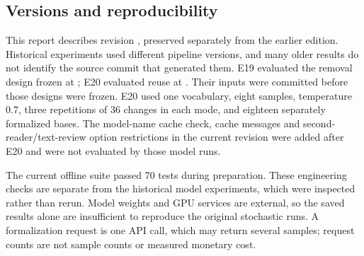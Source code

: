 \subsection{Versions and reproducibility}
This report describes revision , preserved separately from the earlier  edition. Historical experiments used different pipeline versions, and many older results do not identify the source commit that generated them. E19 evaluated the removal design frozen at ; E20 evaluated reuse at . Their inputs were committed before those designs were frozen. E20 used one vocabulary, eight samples, temperature 0.7, three repetitions of 36 changes in each mode, and eighteen separately formalized bases. The model-name cache check, cache messages and second-reader/text-review option restrictions in the current revision were added after E20 and were not evaluated by those model runs.

The current offline suite passed 70 tests during preparation. These engineering checks are separate from the historical model experiments, which were inspected rather than rerun. Model weights and GPU services are external, so the saved results alone are insufficient to reproduce the original stochastic runs. A formalization request is one API call, which may return several samples; request counts are not sample counts or measured monetary cost.
